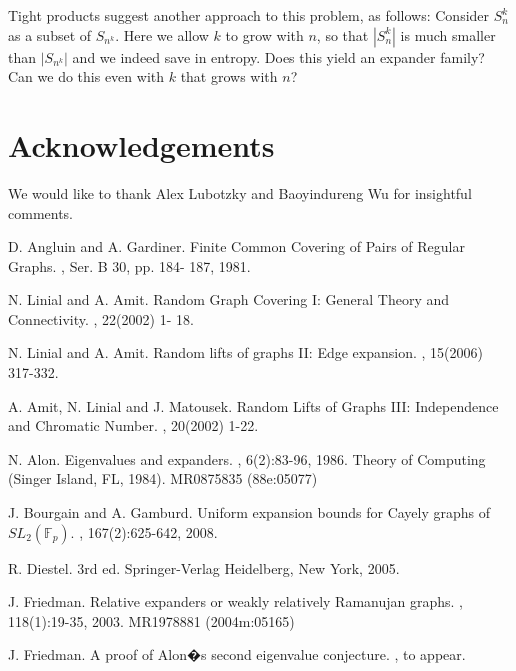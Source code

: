 \documentclass[12pt]{article}
\newtheorem{open question}[theorem]{Open question}
\begin{document}
Tight products suggest another approach to this problem, as follows:
Consider $S_n^k$ as a subset of $S_{n^k}$. Here we allow $k$ to grow with $n$,
so that $|S_n^k|$ is much smaller than $|S_{n^k}|$ and we indeed save in entropy.
Does this yield an expander family? Can we do this even with $k$ that grows with $n$?

\section*{Acknowledgements}
We would like to thank Alex Lubotzky and Baoyindureng Wu for insightful comments.

\begin{thebibliography}{FMT06}

D. Angluin and A. Gardiner.
\newblock Finite Common Covering of Pairs of Regular Graphs.
, Ser. B 30, pp. 184- 187, 1981.

N. Linial and A. Amit.
\newblock Random Graph Covering I: General Theory and Connectivity.
, 22(2002) 1- 18.

N. Linial and A. Amit.
\newblock Random lifts of graphs II: Edge expansion.
, 15(2006) 317-332. 

A. Amit, N. Linial and J. Matousek.
\newblock Random Lifts of Graphs III: Independence and Chromatic Number.
, 20(2002) 1-22.

N. Alon.
\newblock Eigenvalues and expanders.
, 6(2):83-96, 1986. Theory of Computing (Singer Island, FL, 1984). MR0875835 (88e:05077)

J. Bourgain and A. Gamburd.
\newblock Uniform expansion bounds for Cayely graphs of $SL_2(\mathbb F_p)$.
, 167(2):625-642, 2008. 

R. Diestel.
 3rd ed.
\newblock Springer-Verlag Heidelberg, New York, 2005.


J. Friedman.
\newblock Relative expanders or weakly relatively Ramanujan graphs.
, 118(1):19-35, 2003. MR1978881 (2004m:05165)

J. Friedman.
\newblock A proof of Alon�s second eigenvalue conjecture.
, to appear.


\end{thebibliography}
\end{document}
